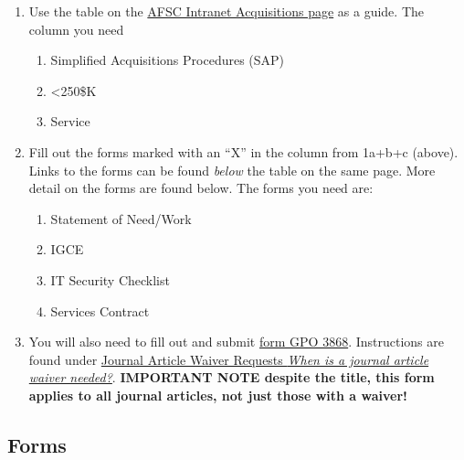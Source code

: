 \documentclass[
  letterpaper,
  DIV=11,
  numbers=noendperiod]{scrreprt}
\providecommand{\tightlist}{%
  \setlength{\itemsep}{0pt}\setlength{\parskip}{0pt}}\usepackage{longtable,booktabs,array}
\begin{document}
\begin{enumerate}
\def\labelenumi{\arabic{enumi}.}
\tightlist
\item
  Use the table on the
  \href{https://sites.google.com/noaa.gov/myafsc/administrative/procurement/acquisition-package}{AFSC
  Intranet Acquisitions page} as a guide. The column you need

  \begin{enumerate}
  \def\labelenumii{\alph{enumii}.}
  \tightlist
  \item
    Simplified Acquisitions Procedures (SAP)\\
  \item
    \textless250\$K\\
  \item
    Service\\
  \end{enumerate}
\item
  Fill out the forms marked with an ``X'' in the column from 1a+b+c
  (above). Links to the forms can be found \emph{below} the table on the
  same page. More detail on the forms are found below. The forms you
  need are:

  \begin{enumerate}
  \def\labelenumii{\alph{enumii}.}
  \tightlist
  \item
    Statement of Need/Work\\
  \item
    IGCE\\
  \item
    IT Security Checklist\\
  \item
    Services Contract\\
  \end{enumerate}
\item
  You will also need to fill out and submit
  \href{https://www.gpo.gov/docs/default-source/forms-standards-pdf-files/3868.pdf?sfvrsn=2}{form
  GPO 3868}. Instructions are found under
  \href{https://sites.google.com/noaa.gov/myafsc/communications/publications-and-rpts}{Journal
  Article Waiver Requests \emph{When is a journal article waiver
  needed?}}. \textbf{IMPORTANT NOTE despite the title, this form applies
  to all journal articles, not just those with a waiver!}
\end{enumerate}

\subsection{Forms}\label{forms}
\end{document}
